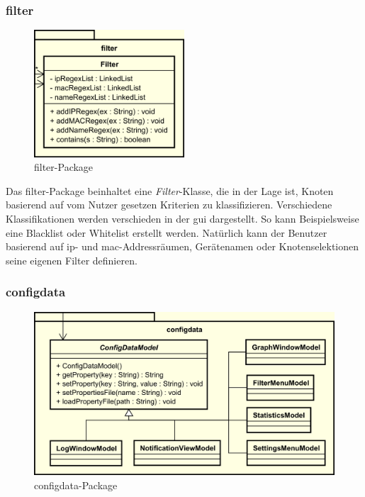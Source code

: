     \subsubsection{filter}
    \label{subsubsec:filter}

    \begin{figure}[H]
      \centering
      \includegraphics[width=0.5\textwidth]{../diagramimages/filter.png}
      \caption{filter-Package}
    \end{figure}

    \medskip
    Das filter-Package beinhaltet eine \textit{Filter}-Klasse, die in der Lage ist,
    Knoten basierend auf vom Nutzer gesetzen Kriterien zu klassifizieren. Verschiedene
    Klassifikationen werden verschieden in der \gls{gui} dargestellt. So kann
    Beispielsweise eine Blacklist oder Whitelist erstellt werden.
    Natürlich kann der Benutzer basierend auf \gls{ip}- und \gls{mac}-Addressräumen,
    Gerätenamen oder Knotenselektionen seine eigenen Filter definieren.

    \subsubsection{configdata}
    \label{subsubsec:configdata}

    \begin{figure}[H]
      \centering
      \includegraphics[width=\textwidth]{../diagramimages/configdata.png}
      \caption{configdata-Package}
    \end{figure}

